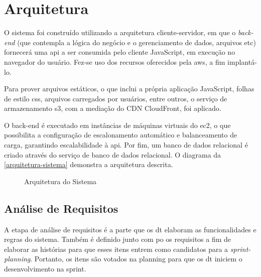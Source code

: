 \section{Arquitetura}
    O sistema foi construído utilizando a arquitetura cliente-servidor, em que o \emph{\gls{back-end}} (que contempla a lógica do negócio e o gerenciamento de dados, arquivos etc) fornecerá uma \ac{api} a ser consumida pelo cliente \gls{JavaScript}, em execução no navegador do usuário. Fez-se uso dos recursos oferecidos pela \ac{aws}, a fim implantá-lo.

    Para prover arquivos estáticos, o que inclui a própria aplicação \ac{JavaScript}, folhas de estilo \ac{css}, arquivos carregados por usuários, entre outros, o serviço de armazenamento \ac{s3}, com a mediação do CDN CloudFront, foi aplicado.

    O back-end é executado em instâncias de máquinas virtuais do \ac{ec2}, o que possibilita a configuração de escalonamento automático e balanceamento de carga, garantindo escalabilidade à \ac{api}. Por fim, um banco de dados relacional é criado através do serviço de banco de dados relacional. O diagrama da \autoref{arquitetura-sistema} demonstra a arquitetura descrita.

\begin{figure}[H]
    \centering
    \caption{\label{arquitetura-sistema}Arquitetura do Sistema}
\end{figure}

\subsection{Análise de Requisitos}
    A etapa de análise de requisitos é a parte que os \ac{dt} elaboram as funcionalidades e regras do sistema. Também é definido junto com \ac{po} os requisitos a fim de elaborar as histórias para que esses itens entrem como candidatos para a \emph{\gls{sprint-planning}}. Portanto, os itens são votados na planning para que os \ac{dt} iniciem o desenvolvimento na sprint.
    
